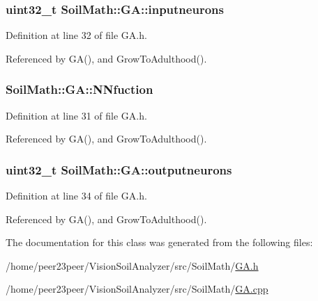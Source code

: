 \hypertarget{class_soil_math_1_1_g_a_ac32591e30dde5ac854ae57a7b9e33298}{}
\subsubsection[{inputneurons}]{\setlength{\rightskip}{0pt plus 5cm}uint32\+\_\+t Soil\+Math\+::\+G\+A\+::inputneurons\hspace{0.3cm}{\ttfamily [private]}}\label{class_soil_math_1_1_g_a_ac32591e30dde5ac854ae57a7b9e33298}


Definition at line 32 of file G\+A.\+h.



Referenced by G\+A(), and Grow\+To\+Adulthood().

\hypertarget{class_soil_math_1_1_g_a_a9b690048c89c32e3153457378b5e1c31}{}
\subsubsection[{N\+Nfuction}]{ Soil\+Math\+::\+G\+A\+::\+N\+Nfuction\hspace{0.3cm}{\ttfamily [private]}}\label{class_soil_math_1_1_g_a_a9b690048c89c32e3153457378b5e1c31}


Definition at line 31 of file G\+A.\+h.



Referenced by G\+A(), and Grow\+To\+Adulthood().

\hypertarget{class_soil_math_1_1_g_a_ab454f9968d5ce2a294b89f85c9d3a74f}{}
\subsubsection[{outputneurons}]{\setlength{\rightskip}{0pt plus 5cm}uint32\+\_\+t Soil\+Math\+::\+G\+A\+::outputneurons\hspace{0.3cm}{\ttfamily [private]}}\label{class_soil_math_1_1_g_a_ab454f9968d5ce2a294b89f85c9d3a74f}


Definition at line 34 of file G\+A.\+h.



Referenced by G\+A(), and Grow\+To\+Adulthood().



The documentation for this class was generated from the following files\+:\begin{DoxyCompactItemize}
\item 
/home/peer23peer/\+Vision\+Soil\+Analyzer/src/\+Soil\+Math/\hyperlink{_g_a_8h}{G\+A.\+h}\item 
/home/peer23peer/\+Vision\+Soil\+Analyzer/src/\+Soil\+Math/\hyperlink{_g_a_8cpp}{G\+A.\+cpp}\end{DoxyCompactItemize}
